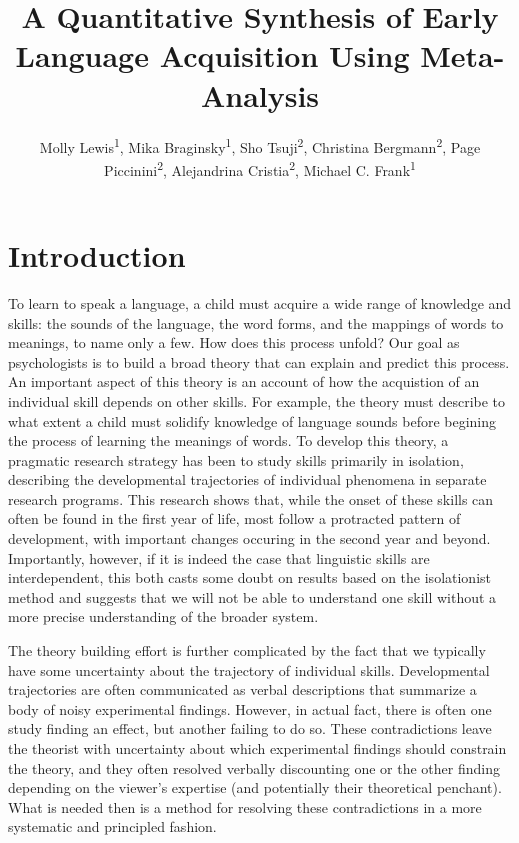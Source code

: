 \documentclass[english,floatsintext,man]{apa6}
\title{A Quantitative Synthesis of Early Language Acquisition Using
Meta-Analysis}
\author{
          Molly Lewis\textsuperscript{1},
          Mika Braginsky\textsuperscript{1},
          Sho Tsuji\textsuperscript{2},
          Christina Bergmann\textsuperscript{2},
          Page Piccinini\textsuperscript{2},
          Alejandrina Cristia\textsuperscript{2},
          Michael C. Frank\textsuperscript{1}  }
\affiliation{
    \vspace{0.5cm}
          \textsuperscript{1} Department Psychology, Stanford University\\
          \textsuperscript{2} Laboratoire de Sciences Cognitives et Psycholinguistique, ENS  }
\begin{document}
\maketitle



\section{Introduction}\label{introduction}

To learn to speak a language, a child must acquire a wide range of
knowledge and skills: the sounds of the language, the word forms, and
the mappings of words to meanings, to name only a few. How does this
process unfold? Our goal as psychologists is to build a broad theory
that can explain and predict this process. An important aspect of this
theory is an account of how the acquistion of an individual skill
depends on other skills. For example, the theory must describe to what
extent a child must solidify knowledge of language sounds before
begining the process of learning the meanings of words. To develop this
theory, a pragmatic research strategy has been to study skills primarily
in isolation, describing the developmental trajectories of individual
phenomena in separate research programs. This research shows that, while
the onset of these skills can often be found in the first year of life,
most follow a protracted pattern of development, with important changes
occuring in the second year and beyond. Importantly, however, if it is
indeed the case that linguistic skills are interdependent, this both
casts some doubt on results based on the isolationist method and
suggests that we will not be able to understand one skill without a more
precise understanding of the broader system.

The theory building effort is further complicated by the fact that we
typically have some uncertainty about the trajectory of individual
skills. Developmental trajectories are often communicated as verbal
descriptions that summarize a body of noisy experimental findings.
However, in actual fact, there is often one study finding an effect, but
another failing to do so. These contradictions leave the theorist with
uncertainty about which experimental findings should constrain the
theory, and they often resolved verbally discounting one or the other
finding depending on the viewer's expertise (and potentially their
theoretical penchant). What is needed then is a method for resolving
these contradictions in a more systematic and principled fashion.
\end{document}
